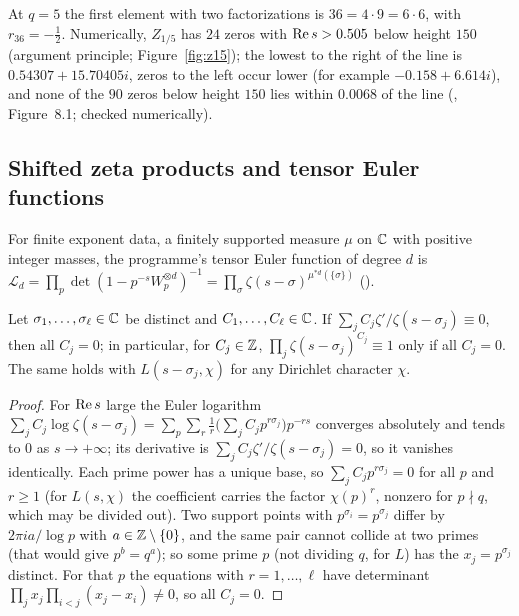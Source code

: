 At $q=5$ the first element with two factorizations is $36=4\cdot9=6\cdot6$, with $r_{36}=-\tfrac12$. Numerically, $Z_{1/5}$ has $24$ zeros with $\operatorname{Re} s>0.505$ below height $150$ (argument principle; Figure~\ref{fig:z15}); the lowest to the right of the line is $0.54307+15.70405i$, zeros to the left occur lower (for example $-0.158+6.614i$), and none of the $90$ zeros below height $150$ lies within $0.0068$ of the line (, Figure~8.1; checked numerically).

\subsection{Shifted zeta products and tensor Euler functions}

For finite exponent data, a finitely supported measure $\mu$ on $\mathbb{C}$ with positive integer masses, the programme's tensor Euler function of degree $d$ is $\mathcal{L}_d=\prod_p\det(1-p^{-s}W_p^{\otimes d})^{-1}=\prod_\sigma\zeta(s-\sigma)^{\mu^{*d}(\{\sigma\})}$ ().

\begin{lemma}\label{lem:shifted}
Let $\sigma_1,\dots,\sigma_\ell\in\mathbb{C}$ be distinct and $C_1,\dots,C_\ell\in\mathbb{C}$. If $\sum_jC_j\zeta'/\zeta(s-\sigma_j)\equiv0$, then all $C_j=0$; in particular, for $C_j\in\mathbb{Z}$, $\prod_j\zeta(s-\sigma_j)^{C_j}\equiv1$ only if all $C_j=0$. The same holds with $L(s-\sigma_j,\chi)$ for any Dirichlet character $\chi$.
\end{lemma}

\begin{proof}
For $\operatorname{Re} s$ large the Euler logarithm $\sum_jC_j\log\zeta(s-\sigma_j)=\sum_p\sum_r\frac1r\big(\sum_jC_jp^{r\sigma_j}\big)p^{-rs}$ converges absolutely and tends to $0$ as $s\to+\infty$; its derivative is $\sum_jC_j\zeta'/\zeta(s-\sigma_j)=0$, so it vanishes identically. Each prime power has a unique base, so $\sum_jC_jp^{r\sigma_j}=0$ for all $p$ and $r\ge1$ (for $L(s,\chi)$ the coefficient carries the factor $\chi(p)^r$, nonzero for $p\nmid q$, which may be divided out). Two support points with $p^{\sigma_i}=p^{\sigma_j}$ differ by $2\pi ia/\log p$ with $a\in\mathbb{Z}\setminus\{0\}$, and the same pair cannot collide at two primes (that would give $p^b=q^a$); so some prime $p$ (not dividing $q$, for $L$) has the $x_j=p^{\sigma_j}$ distinct. For that $p$ the equations with $r=1,\dots,\ell$ have determinant $\prod_jx_j\prod_{i<j}(x_j-x_i)\ne0$, so all $C_j=0$.
\end{proof}

